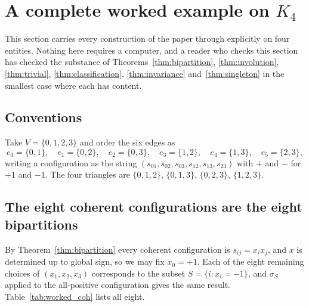 \documentclass[11pt,a4paper]{article}
\newcommand{\Kfour}{K_4}
\begin{document}
\section{A complete worked example on \texorpdfstring{$\Kfour$}{K4}}
\label{sec:worked}

This section carries every construction of the paper through explicitly on four entities. Nothing here requires a computer, and a reader who checks this section has checked the substance of Theorems~\ref{thm:bipartition}, \ref{thm:involution}, \ref{thm:trivial}, \ref{thm:classification}, \ref{thm:invariance} and~\ref{thm:singleton} in the smallest case where each has content.

\subsection{Conventions}

Take $V=\{0,1,2,3\}$ and order the six edges as
\[
e_0=\{0,1\},\quad e_1=\{0,2\},\quad e_2=\{0,3\},\quad e_3=\{1,2\},\quad e_4=\{1,3\},\quad e_5=\{2,3\},
\]
writing a configuration as the string $(s_{01},s_{02},s_{03},s_{12},s_{13},s_{23})$ with $+$ and $-$ for $+1$ and $-1$. The four triangles are $\{0,1,2\}$, $\{0,1,3\}$, $\{0,2,3\}$, $\{1,2,3\}$.

\subsection{The eight coherent configurations are the eight bipartitions}
\label{subsec:worked_coh}

By Theorem~\ref{thm:bipartition} every coherent configuration is $s_{ij}=x_ix_j$, and $x$ is determined up to global sign, so we may fix $x_0=+1$. Each of the eight remaining choices of $(x_1,x_2,x_3)$ corresponds to the subset $S=\{i:x_i=-1\}$, and $\sigma_S$ applied to the all-positive configuration gives the same result. Table~\ref{tab:worked_coh} lists all eight.
\end{document}
